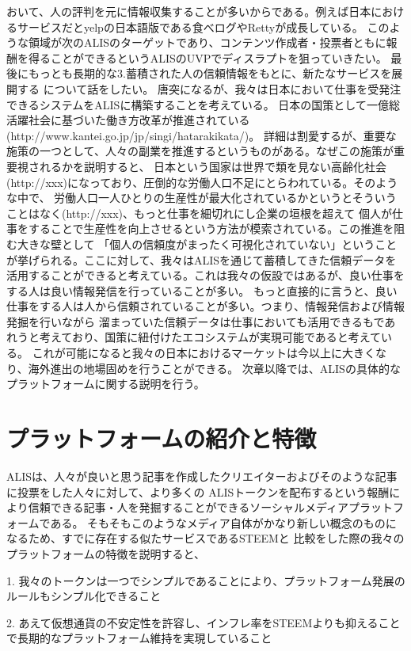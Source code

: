 \documentclass{jsarticle}
\begin{document}
おいて、人の評判を元に情報収集することが多いからである。例えば日本におけるサービスだとyelpの日本語版である食べログやRettyが成長している。
このような領域が次のALISのターゲットであり、コンテンツ作成者・投票者ともに報酬を得ることができるというALISのUVPでディスラプトを狙っていきたい。
最後にもっとも長期的な3.蓄積された人の信頼情報をもとに、新たなサービスを展開する について話をしたい。
唐突になるが、我々は日本において仕事を受発注できるシステムをALISに構築することを考えている。
日本の国策として一億総活躍社会に基づいた働き方改革が推進されている(http://www.kantei.go.jp/jp/singi/hatarakikata/)。
詳細は割愛するが、重要な施策の一つとして、人々の副業を推進するというものがある。なぜこの施策が重要視されるかを説明すると、
日本という国家は世界で類を見ない高齢化社会(http://xxx)になっており、圧倒的な労働人口不足にとらわれている。そのような中で、
労働人口一人ひとりの生産性が最大化されているかというとそういうことはなく(http://xxx)、もっと仕事を細切れにし企業の垣根を超えて
個人が仕事をすることで生産性を向上させるという方法が模索されている。この推進を阻む大きな壁として
「個人の信頼度がまったく可視化されていない」ということが挙げられる。ここに対して、我々はALISを通じて蓄積してきた信頼データを
活用することができると考えている。これは我々の仮設ではあるが、良い仕事をする人は良い情報発信を行っていることが多い。
もっと直接的に言うと、良い仕事をする人は人から信頼されていることが多い。つまり、情報発信および情報発掘を行いながら
溜まっていた信頼データは仕事においても活用できるもであれうと考えており、国策に紐付けたエコシステムが実現可能であると考えている。
これが可能になると我々の日本におけるマーケットは今以上に大きくなり、海外進出の地場固めを行うことができる。
次章以降では、ALISの具体的なプラットフォームに関する説明を行う。
\section{プラットフォームの紹介と特徴}
ALISは、人々が良いと思う記事を作成したクリエイターおよびそのような記事に投票をした人々に対して、より多くの
ALISトークンを配布するという報酬により信頼できる記事・人を発掘することができるソーシャルメディアプラットフォームである。
そもそもこのようなメディア自体がかなり新しい概念のものになるため、すでに存在する似たサービスであるSTEEMと
比較をした際の我々のプラットフォームの特徴を説明すると、

1. 我々のトークンは一つでシンプルであることにより、プラットフォーム発展のルールもシンプル化できること

2. あえて仮想通貨の不安定性を許容し、インフレ率をSTEEMよりも抑えることで長期的なプラットフォーム維持を実現していること
\end{document}
